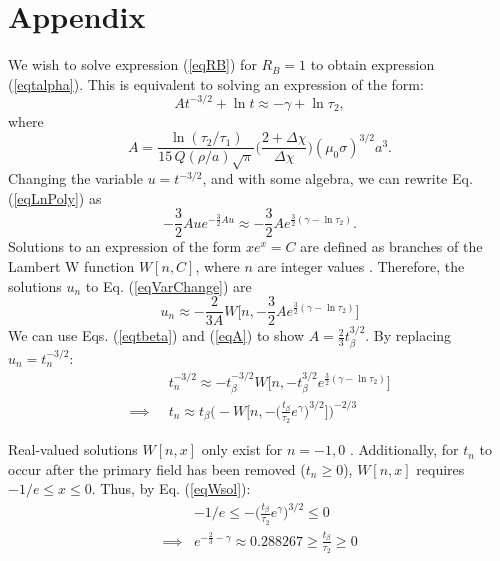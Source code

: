 \section{Appendix}

We wish to solve expression (\ref{eqRB}) for $R_B=1$ to obtain expression (\ref{eqtalpha}).  This is equivalent to solving an expression of the form:
\begin{equation}
\label{eqLnPoly} A t^{-3/2} + \ln t \approx -\gamma + \ln \tau_2,
\end{equation}
where
\begin{equation}
\label{eqA} A = \frac{\ln(\tau_2/\tau_1)}{15 \, Q(\rho /a)
\sqrt{\pi}} \! \Bigg ( \frac{2+\Delta \chi}{\Delta \chi} \Bigg )
(\mu_0 \sigma)^{3/2} a^3.
\end{equation}
Changing the variable $u=t^{-3/2}$, and with some algebra, we can rewrite Eq. (\ref{eqLnPoly}) as
\begin{equation}
\label{eqVarChange} - \frac{3}{2} A u e^{- \frac{3}{2} A u} \approx
- \frac{3}{2} A e^{\frac{3}{2} (\gamma - \ln \tau_2)}.
\end{equation}
Solutions to an expression of the form $x e^x = C$ are defined as branches of the  Lambert W function $W[n,C]$, where $n$ are integer
values \cite{Corless1996}. Therefore, the solutions $u_n$ to Eq. (\ref{eqVarChange}) are
\begin{equation}
u_n \approx - \frac{2}{3A} W \Big [ n, - \frac{3}{2} A e^{\frac{3}{2}(\gamma - \ln \tau_2)} \Big ]
\end{equation}
We can use Eqs. (\ref{eqtbeta}) and (\ref{eqA}) to show $A = \frac{2}{3} t_\beta^{3/2}$. By replacing $u_n =
t_n^{-3/2}$:
\begin{align}
&t_n^{-3/2} \approx - t_\beta^{-3/2} W \Big [ n, - t_\beta^{3/2} e^{\frac{3}{2}(\gamma - \ln \tau_2)} \Big ] \nonumber \\
\label{eqWsol}
\implies \; \; &t_n \approx t_\beta \Bigg ( - W \Bigg [ n, - \Big ( \frac{t_\beta}{\tau_2} e^\gamma \Big )^{3/2} \Bigg ] \Bigg )^{-2/3}
\end{align}

Real-valued solutions $W[n,x]$ only exist for $n=-1,0$ \cite{Corless1996}.  Additionally, for $t_n$ to occur after the primary field has been removed ($t_n \geq 0$), $W [n,x]$ requires $-1/e \leq x \leq 0$. Thus, by Eq. (\ref{eqWsol}):
\begin{align}
& -1/e \leq - \Big ( \frac{t_\beta}{\tau_2}e^\gamma \Big )^{3/2} \leq 0 \nonumber \\
\label{eqWcond}
\implies & e^{-\frac{2}{3}-\gamma} \approx 0.288267 \geq \frac{t_\beta}{\tau_2} \geq 0
\end{align}

